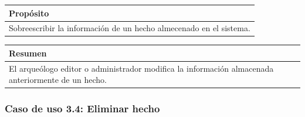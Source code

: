     \begin{table}[H]
        \centering
        \begin{tabularx}{\textwidth}{@{} |L |@{}} \hline
            \textbf{Propósito} \\
            \hline
            Sobreescribir la información de un hecho almecenado en el sistema. \\
            \hline
        \end{tabularx}
    \end{table}

    \begin{table}[H]
        \centering
        \begin{tabularx}{\textwidth}{@{} |L |@{}} \hline
            \textbf{Resumen} \\
            \hline
            El arqueólogo editor o administrador modifica la información almacenada
            anteriormente de un hecho.\\
            \hline
        \end{tabularx}
    \end{table}

\subsubsection{Caso de uso 3.4: Eliminar hecho}

